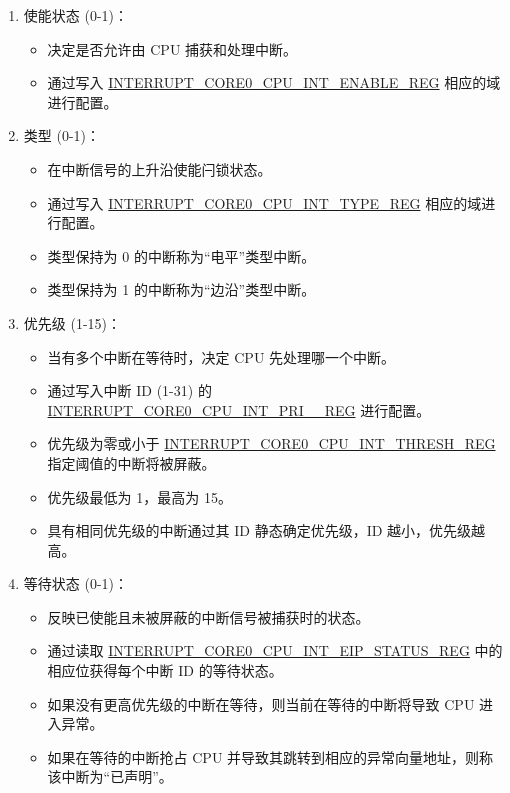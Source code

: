 \documentclass[main\_\_CN.tex]{subfiles}
\begin{document}
\begin{enumerate}
    \item 使能状态 (0-1)：
    \begin{itemize}
        \item 决定是否允许由 CPU 捕获和处理中断。
        \item 通过写入 \hyperref[regdesc:INTERRUPTCORE0CPUINTENABLEREG]{INTERRUPT\_CORE0\_CPU\_INT\_ENABLE\_REG} 相应的域进行配置。
    \end{itemize}
    \item 类型 (0-1)：
    \begin{itemize}
        \item 在中断信号的上升沿使能闩锁状态。
        \item 通过写入 \hyperref[regdesc:INTERRUPTCORE0CPUINTTYPEREG]{INTERRUPT\_CORE0\_CPU\_INT\_TYPE\_REG} 相应的域进行配置。
        \item 类型保持为 0 的中断称为“电平”类型中断。
        \item 类型保持为 1 的中断称为“边沿”类型中断。
    \end{itemize}
    \item 优先级 (1-15)：
    \begin{itemize}
        \item 当有多个中断在等待时，决定 CPU 先处理哪一个中断。
        \item 通过写入中断 ID  (1-31) 的 \hyperref[regdesc:INTERRUPTCORE0CPUINTPRI0REG]{INTERRUPT\_CORE0\_CPU\_INT\_PRI\_\_REG} 进行配置。
        \item 优先级为零或小于 \hyperref[regdesc:INTERRUPTCORE0CPUINTTHRESHREG]{INTERRUPT\_CORE0\_CPU\_INT\_THRESH\_REG} 指定阈值的中断将被屏蔽。
        \item 优先级最低为 1，最高为 15。
        \item 具有相同优先级的中断通过其 ID 静态确定优先级，ID 越小，优先级越高。
    \end{itemize}
    \item 等待状态 (0-1)：
    \begin{itemize}
        \item 反映已使能且未被屏蔽的中断信号被捕获时的状态。
        \item 通过读取 \hyperref[regdesc:INTERRUPTCORE0CPUINTEIPSTATUSREG]{INTERRUPT\_CORE0\_CPU\_INT\_EIP\_STATUS\_REG} 中的相应位获得每个中断 ID 的等待状态。
        \item 如果没有更高优先级的中断在等待，则当前在等待的中断将导致 CPU 进入异常。
        \item 如果在等待的中断抢占 CPU 并导致其跳转到相应的异常向量地址，则称该中断为“已声明”。

\end{itemize}
\end{enumerate}
\end{document}
